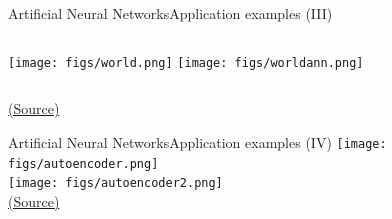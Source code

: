 \documentclass[10pt,compress]{beamer} %
\begin{document}
\begin{frame}{Artificial Neural Networks}{Application examples (III)}
    \begin{columns}
	\centering\texttt{[image: figs/world.png]}
	\centering\texttt{[image: figs/worldann.png]}
    \end{columns}
    \centering \scriptsize\href{https://en.wikibooks.org/wiki/Cyberbotics\%27\_Robot\_Curriculum/}{(Source)}
\end{frame}

\begin{frame}{Artificial Neural Networks}{Application examples (IV)}
	\centering\texttt{[image: figs/autoencoder.png]}\\\smallskip
	\centering\texttt{[image: figs/autoencoder2.png]}\\
	\scriptsize\href{http://i-systems.github.io/HSE545/machine\%20learning\%20all/KIMM/06\_KIMM\_Autoencoder.html}{(Source)}
\end{frame}

\end{document}
